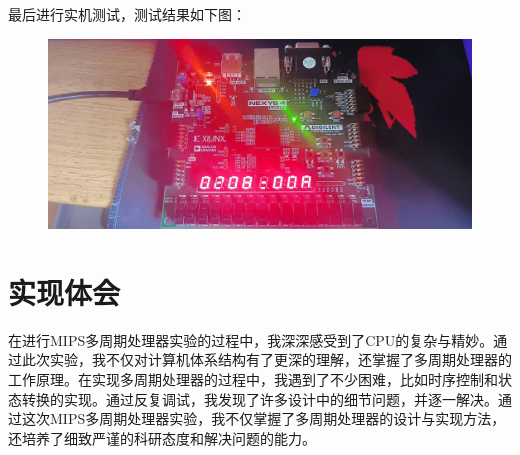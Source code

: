 \documentclass[UTF8]{article}
\begin{document}
\begin{enumerate}
			\par 最后进行实机测试，测试结果如下图：
			\begin{figure}[htbp]
				\centering
				\includegraphics[scale=0.15]{2-3-5.jpg}
			\end{figure}
	\end{enumerate}
	\section{实现体会}
	\par 在进行MIPS多周期处理器实验的过程中，我深深感受到了CPU的复杂与精妙。通过此次实验，我不仅对计算机体系结构有了更深的理解，还掌握了多周期处理器的工作原理。在实现多周期处理器的过程中，我遇到了不少困难，比如时序控制和状态转换的实现。通过反复调试，我发现了许多设计中的细节问题，并逐一解决。通过这次MIPS多周期处理器实验，我不仅掌握了多周期处理器的设计与实现方法，还培养了细致严谨的科研态度和解决问题的能力。
\end{document}
